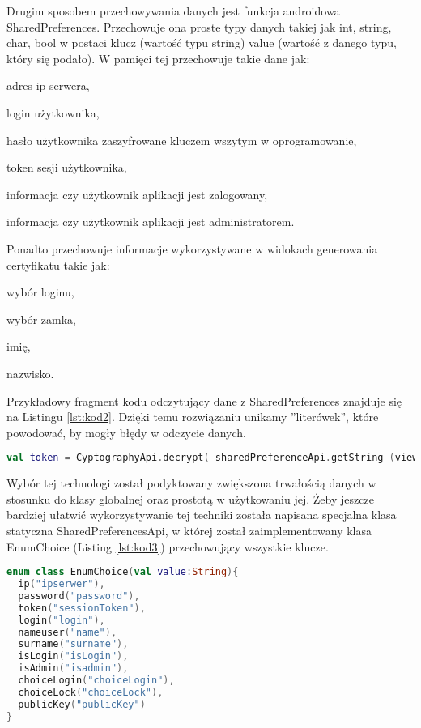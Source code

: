 	Drugim sposobem przechowywania danych jest funkcja androidowa SharedPreferences. Przechowuje ona proste typy danych takiej jak int, string, char, bool w postaci klucz (wartość typu string) value (wartość z danego typu, który się podało). W pamięci tej przechowuje takie dane jak:
	\begin{itemize*}
		\item adres ip serwera,
		\item login użytkownika,
		\item hasło użytkownika zaszyfrowane kluczem wszytym w oprogramowanie,
		\item token sesji użytkownika,
		\item informacja czy użytkownik aplikacji jest zalogowany,
		\item informacja czy użytkownik aplikacji jest administratorem.	
	\end{itemize*}

	Ponadto przechowuje informacje wykorzystywane w widokach generowania certyfikatu takie jak:
	\begin{itemize*}
		\item wybór loginu,
		\item wybór zamka,
		\item imię, 
		\item nazwisko.
	\end{itemize*}	

	Przykładowy fragment kodu odczytujący dane z SharedPreferences znajduje się na Listingu \ref{lst:kod2}. Dzięki temu rozwiązaniu unikamy ''literówek'', które powodować, by mogły błędy w odczycie danych. 
		
	\begin{lstlisting}[caption={Fragment kodu odpowiedzialny za odczytanie tokenu}, label={lst:kod2}, language=Kotlin]
val token = CyptographyApi.decrypt( sharedPreferenceApi.getString (view, EnumChoice.token))
	\end{lstlisting}
	
	Wybór tej technologi został podyktowany zwiększona trwałością danych w stosunku do klasy globalnej oraz prostotą w użytkowaniu jej. Żeby jeszcze bardziej ułatwić wykorzystywanie tej techniki została napisana specjalna klasa statyczna SharedPreferencesApi, w której został zaimplementowany klasa EnumChoice \linebreak (Listing \ref{lst:kod3}) przechowujący wszystkie klucze.
	
		\begin{lstlisting}[caption={klasa EnumChoice.}, label={lst:kod3}, language=Kotlin]
enum class EnumChoice(val value:String){
  ip("ipserwer"),
  password("password"),
  token("sessionToken"),
  login("login"), 
  nameuser("name"), 
  surname("surname"),
  isLogin("isLogin"), 
  isAdmin("isadmin"),
  choiceLogin("choiceLogin"), 
  choiceLock("choiceLock"),
  publicKey("publicKey")
}
		\end{lstlisting}
		
